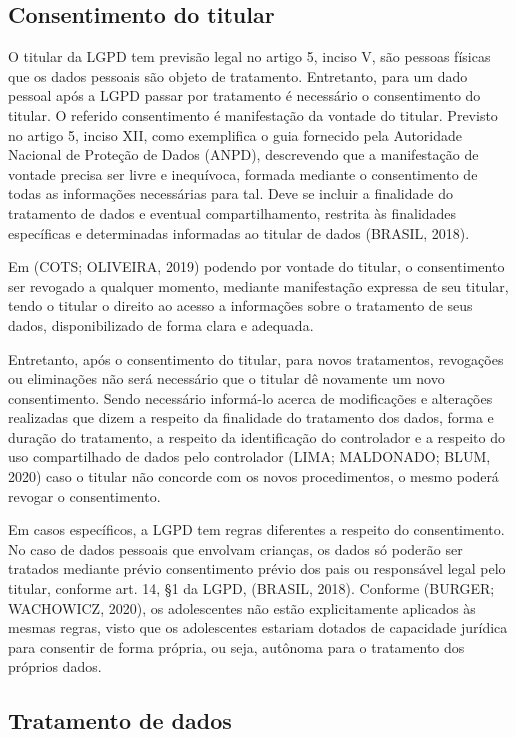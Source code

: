 \documentclass[
	12pt,				%
	openright,			%
	oneside,			%
	a4paper,			%
	english,			%
	french,				%
	spanish,			%
	brazil,				%
	]{abntex2}
\begin{document}
\subsection{Consentimento do titular}

O titular da LGPD tem previsão legal no artigo 5, inciso V, são pessoas físicas que os dados pessoais são objeto de tratamento. Entretanto, para um dado pessoal após a LGPD passar por tratamento é necessário o consentimento do titular. O referido consentimento é manifestação da vontade do titular. Previsto no artigo 5, inciso XII, como exemplifica o guia fornecido pela Autoridade Nacional de Proteção de Dados (ANPD), descrevendo que a manifestação de vontade precisa ser livre e inequívoca, formada mediante o consentimento de todas as informações necessárias para tal. Deve se incluir a finalidade do tratamento de dados e eventual compartilhamento, restrita às finalidades específicas e determinadas informadas ao titular de dados (BRASIL, 2018).

Em (COTS; OLIVEIRA, 2019) podendo por vontade do titular, o consentimento ser revogado a qualquer momento, mediante manifestação expressa de seu titular, tendo o titular o direito ao acesso a informações sobre o tratamento de seus dados, disponibilizado de forma clara e adequada.

Entretanto, após o consentimento do titular, para novos tratamentos, revogações ou eliminações não será necessário que o titular dê novamente um novo consentimento. Sendo necessário informá-lo acerca de modificações e alterações realizadas que dizem a respeito da finalidade do tratamento dos dados, forma e duração do tratamento, a respeito da identificação do controlador e a respeito do uso compartilhado de dados pelo controlador (LIMA; MALDONADO; BLUM, 2020) caso o titular não concorde com os novos procedimentos, o mesmo poderá revogar o consentimento.

Em casos específicos, a LGPD tem regras diferentes a respeito do consentimento. No caso de dados pessoais que envolvam crianças, os dados só poderão ser tratados mediante prévio consentimento prévio dos pais ou responsável legal pelo titular, conforme art. 14, §1 da LGPD, (BRASIL, 2018). Conforme (BURGER; WACHOWICZ, 2020), os adolescentes não estão explicitamente aplicados às mesmas regras, visto que os adolescentes estariam dotados de capacidade jurídica para consentir de forma própria, ou seja, autônoma para o tratamento dos próprios dados.

\subsection{Tratamento de dados}
\end{document}
